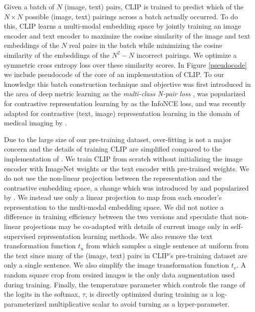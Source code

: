 \documentclass{article}
\begin{document}
Given a batch of $N$ (image, text) pairs, CLIP is trained to predict which of the $N\times N$ possible (image, text) pairings across a batch actually occurred. To do this, CLIP learns a multi-modal embedding space by jointly training an image encoder and text encoder to maximize the cosine similarity of the image and text embeddings of the $N$ real pairs in the batch while minimizing the cosine similarity of the embeddings of the $N^2-N$ incorrect pairings. We optimize a symmetric cross entropy loss over these similarity scores. In Figure \ref{pseudocode} we include pseudocode of the core of an implementation of CLIP. To our knowledge this batch construction technique and objective was first introduced in the area of deep metric learning as the \textit{multi-class N-pair loss} \citet{sohn2016improved}, was popularized for contrastive representation learning by \citet{oord2018representation} as the InfoNCE loss, and was recently adapted for contrastive (text, image) representation learning in the domain of medical imaging by \citet{zhang2020contrastive}.

Due to the large size of our pre-training dataset, over-fitting is not a major concern and the details of training CLIP are simplified compared to the implementation of \citet{zhang2020contrastive}. We train CLIP from scratch without initializing the image encoder with ImageNet weights or the text encoder with pre-trained weights. We do not use the non-linear projection between the representation and the contrastive embedding space, a change which was introduced by \citet{bachman2019learning} and popularized by \citet{chen2020simple}. We instead use only a linear projection to map from each encoder's representation to the multi-modal embedding space. We did not notice a difference in training efficiency between the two versions and speculate that non-linear projections may be co-adapted with details of current image only in self-supervised representation learning methods. We also remove the text transformation function $t_u$ from \citet{zhang2020contrastive} which samples a single sentence at uniform from the text since many of the (image, text) pairs in CLIP's pre-training dataset are only a single sentence. We also simplify the image transformation function $t_v$. A random square crop from resized images is the only data augmentation used during training. Finally, the temperature parameter which controls the range of the logits in the softmax, $\tau$, is directly optimized during training as a log-parameterized multiplicative scalar to avoid turning as a hyper-parameter.
\end{document}
